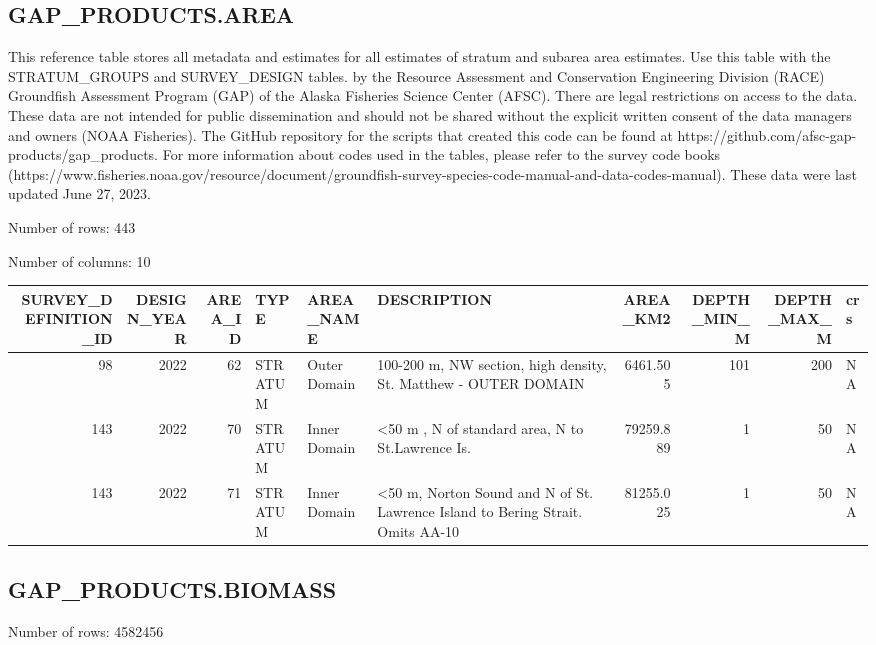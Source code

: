 \documentclass[
  letterpaper,
  oneside,
  open=any]{scrbook}
\begin{document}
\hypertarget{gap_products.area}{%
\subsection{GAP\_PRODUCTS.AREA}\label{gap_products.area}}

This reference table stores all metadata and estimates for all estimates
of stratum and subarea area estimates. Use this table with the
STRATUM\_GROUPS and SURVEY\_DESIGN tables. by the Resource Assessment
and Conservation Engineering Division (RACE) Groundfish Assessment
Program (GAP) of the Alaska Fisheries Science Center (AFSC). There are
legal restrictions on access to the data. These data are not intended
for public dissemination and should not be shared without the explicit
written consent of the data managers and owners (NOAA Fisheries). The
GitHub repository for the scripts that created this code can be found at
https://github.com/afsc-gap-products/gap\_products. For more information
about codes used in the tables, please refer to the survey code books
(https://www.fisheries.noaa.gov/resource/document/groundfish-survey-species-code-manual-and-data-codes-manual).
These data were last updated June 27, 2023.

Number of rows: 443

Number of columns: 10

\begin{tabular}{r|r|r|l|l|l|r|r|r|l}
\hline
SURVEY\_DEFINITION\_ID & DESIGN\_YEAR & AREA\_ID & TYPE & AREA\_NAME & DESCRIPTION & AREA\_KM2 & DEPTH\_MIN\_M & DEPTH\_MAX\_M & crs\\
\hline
98 & 2022 & 62 & STRATUM & Outer Domain & 100-200 m, NW section, high density, St. Matthew - OUTER DOMAIN & 6461.505 & 101 & 200 & NA\\
\hline
143 & 2022 & 70 & STRATUM & Inner Domain & <50 m , N of standard area, N to St.Lawrence Is. & 79259.889 & 1 & 50 & NA\\
\hline
143 & 2022 & 71 & STRATUM & Inner Domain & <50 m, Norton Sound and N of St. Lawrence Island to Bering Strait. Omits AA-10 & 81255.025 & 1 & 50 & NA\\
\hline
\end{tabular}

\hypertarget{gap_products.biomass}{%
\subsection{GAP\_PRODUCTS.BIOMASS}\label{gap_products.biomass}}

Number of rows: 4582456
\end{document}
